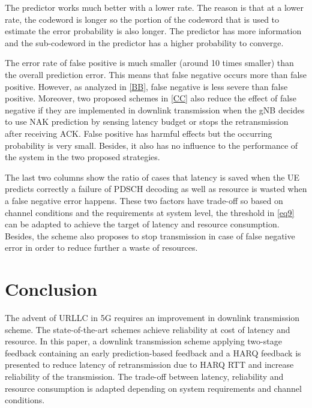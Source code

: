 \documentclass[conference]{IEEEtran}
\begin{document}
The predictor works much better with a lower rate. The reason is that at a lower rate, the codeword is longer so the portion of the codeword that is used to estimate the error probability is also longer. The predictor has more information and the sub-codeword in the predictor has a higher probability to converge.

The error rate of false positive is much smaller (around 10 times smaller) than the overall prediction error. This means that false negative occurs more than false positive. However, as analyzed in \ref{BB}, false negative is less severe than false positive. Moreover, two proposed schemes in \ref{CC} also reduce the effect of false negative if they are implemented in downlink transmission when the gNB decides to use NAK prediction by sensing latency budget or stops the retransmission after receiving ACK. False positive has harmful effects but the occurring probability is very small. Besides, it also has no influence to the performance of the system in the two proposed strategies. 

The last two columns show the ratio of cases that latency is saved when the UE predicts correctly a failure of PDSCH decoding as well as resource is wasted when a false negative error happens. These two factors have trade-off so based on channel conditions and the requirements at system level, the threshold in \eqref{eq9} can be adapted to achieve the target of latency and resource consumption. Besides, the scheme also proposes to stop transmission in case of false negative error in order to reduce further a waste of resources.

\section{Conclusion}

The advent of URLLC in 5G requires an improvement in downlink transmission scheme. The state-of-the-art schemes achieve reliability at cost of latency and resource. In this paper, a downlink transmission scheme applying two-stage feedback containing an early prediction-based feedback and a HARQ feedback is presented to reduce latency of retransmission due to HARQ RTT and increase reliability of the transmission. The trade-off between latency, reliability and resource consumption is adapted depending on system requirements and channel conditions.
\end{document}
